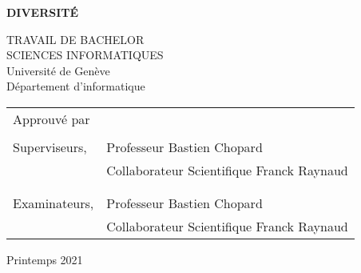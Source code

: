\thispagestyle{empty}

\vspace*{+5em}
\begin{center}
	\textbf{DIVERSITÉ}\\
	\vspace*{+4em}

	\vspace{+2em}
	TRAVAIL DE BACHELOR\\
	SCIENCES INFORMATIQUES\\

	\vspace*{+3em}
	Université de Genève\\
	Département d'informatique\\
	\vspace*{+2em}

\end{center}

\begin{tabular}{ l l }
	Approuvé par  &                                           \\
	              &                                           \\
	Superviseurs, & Professeur Bastien Chopard                \\
	              & Collaborateur Scientifique Franck Raynaud \\
	              &                                           \\
	              &                                           \\
	Examinateurs, & Professeur Bastien Chopard                \\
	              & Collaborateur Scientifique Franck Raynaud \\
\end{tabular}

\vspace*{+4em}

\begin{center}
	Printemps 2021
\end{center}

